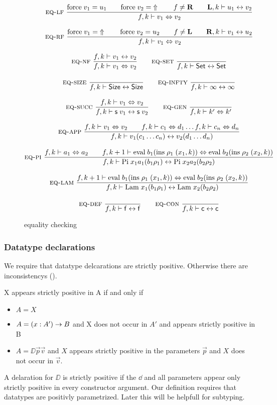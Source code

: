 \begin{figure}[p]
\begin{gather*}
\mbox{\sc eq-lf}\ \dfrac{\mathrm{force} \; v_1 = u_1 \qquad \mathrm{force} \; v_2 = \;\Uparrow 
\qquad
f \neq \mathbf{R} \qquad \mathbf{L},k\vdash u_1{\;\leftrightarrow\;}v_2}{ f,k\vdash v_1\Leftrightarrow v_2}
\\[2ex]
\mbox{\sc eq-rf}\ \dfrac{\mathrm{force} \; v_1 = \;\Uparrow \qquad \mathrm{force} \; v_2 = u_2 
\qquad
f \neq \mathbf{L} \qquad \mathbf{R},k\vdash v_1{\;\leftrightarrow\;}u_2}{ f,k\vdash v_1\Leftrightarrow v_2}
\\[2ex]
\mbox{\sc eq-nf}\ \dfrac{f,k\vdash v_1{\;\leftrightarrow\;}v_2}{ f,k\vdash v_1\Leftrightarrow v_2}
\qquad
\mbox{\sc eq-set}\ \dfrac{}{f,k\vdash\mathsf{Set}{\;\leftrightarrow\;}\mathsf{Set}}
\\[2ex]
\mbox{\sc eq-size}\ \dfrac{}{f,k\vdash\mathsf{Size}{\;\leftrightarrow\;}\mathsf{Size}}
\qquad
\mbox{\sc eq-infty}\ \dfrac{}{f,k\vdash\infty{\;\leftrightarrow\;}\infty}
\\[2ex]
\mbox{\sc eq-succ}\ \dfrac{f,k\vdash v_1\Leftrightarrow v_2}{f,k\vdash\mathsf{s}\; v_1{\;\leftrightarrow\;}\mathsf{s}\; v_2}
\qquad
\mbox{\sc eq-gen}\ \dfrac{}{f,k\vdash k'\Leftrightarrow k'}
\\[2ex]
\mbox{\sc eq-app}\ \dfrac{f,k\vdash v_1\Leftrightarrow v_2 \qquad
f,k\vdash c_1\Leftrightarrow d_1 \ldots f,k\vdash c_n\Leftrightarrow d_n}{f,k\vdash v_1 (c_1 \ldots c_n){\;\leftrightarrow\;}v_2 (d_1 \ldots d_n)}
\\[2ex]
\mbox{\sc eq-pi}\ \dfrac{f,k\vdash a_1\Leftrightarrow a_2
\qquad
f,k+1\vdash\mathrm{eval} \; b_1 (\mathrm{ins} \; \rho_1 \; (x_1,k))\Leftrightarrow\mathrm{eval} \; b_2 (\mathrm{ins} \; \rho_2 \; (x_2,k))}{f,k\vdash\mathrm{Pi} \; x_1 a_1 (b_1 \rho_1){\;\leftrightarrow\;}\mathrm{Pi} \; x_2 a_2 (b_2 \rho_2)}
\\[2ex]
\mbox{\sc eq-lam}\ \dfrac{f,k+1\vdash\mathrm{eval} \; b_1 (\mathrm{ins} \; \rho_1 \; (x_1,k))\Leftrightarrow\mathrm{eval} \; b_2 (\mathrm{ins} \; \rho_2 \; (x_2,k))}{f,k\vdash\mathrm{Lam} \; x_1 (b_1 \rho_1){\;\leftrightarrow\;}\mathrm{Lam} \; x_2 (b_2 \rho_2)}
\\[2ex]
\mbox{\sc eq-def}\ \dfrac{}{f,k\vdash\mathsf{f}{\;\leftrightarrow\;}\mathsf{f}}
\qquad
\mbox{\sc eq-con}\ \dfrac{}{f,k\vdash\mathsf{c}{\;\leftrightarrow\;}\mathsf{c}}
\end{gather*}
\caption{equality checking}
\end{figure}

\subsubsection{Datatype declarations}
We require that datatype delcarations are strictly positive.
Otherwise there are inconsistencys (\cite{paulinmohring93inductive}).
\begin{definition}
X appears strictly positive in A if and only if
\begin{itemize}
\item
$ A = X$
\item
$ A = ( x : A' ) \rightarrow B $ and X does not occur in $A'$  and appears strictly positive in B
\item
$ A = \DD \vec{p} \vec{v} $ and $X$ appears strictly positive in the parameters $\vec{p}$ 
and $X$ does not occur in $\vec{v}$.
\end{itemize}
\end{definition}
A delaration for $\DD$ is strictly positive if the $\dd$ and all parameters appear only
strictly positive in every constructor argument.
Our definition requires that datatypes are positivly parametrized.
Later this will be helpfull for subtyping.

